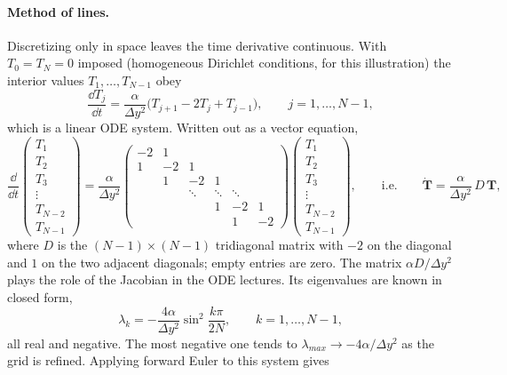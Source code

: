 \paragraph{Method of lines.} Discretizing only in space leaves the time derivative continuous. With $T_0=T_N=0$ imposed (homogeneous Dirichlet conditions, for this illustration) the interior values $T_1,\dots,T_{N-1}$ obey
\begin{equation}
\frac{\dd T_j}{\dd t}=\frac{\alpha}{\Delta y^2}\big(T_{j+1}-2T_j+T_{j-1}\big),\qquad j=1,\dots,N-1,
\end{equation}
which is a linear ODE system. Written out as a vector equation,
\begin{equation}
\frac{\dd}{\dd t}
\begin{pmatrix}T_1\\T_2\\T_3\\\vdots\\T_{N-2}\\T_{N-1}\end{pmatrix}
=\frac{\alpha}{\Delta y^2}
\begin{pmatrix}
-2 & 1 & & & & \\
1 & -2 & 1 & & & \\
 & 1 & -2 & 1 & & \\
 & & \ddots & \ddots & \ddots & \\
 & & & 1 & -2 & 1\\
 & & & & 1 & -2
\end{pmatrix}
\begin{pmatrix}T_1\\T_2\\T_3\\\vdots\\T_{N-2}\\T_{N-1}\end{pmatrix},
\qquad\text{i.e.}\qquad
\dot{\mathbf T}=\frac{\alpha}{\Delta y^2}\,D\,\mathbf T,
\end{equation}
where $D$ is the $(N-1)\times(N-1)$ tridiagonal matrix with $-2$ on the diagonal and $1$ on the two adjacent diagonals; empty entries are zero. The matrix $\alpha D/\Delta y^2$ plays the role of the Jacobian in the ODE lectures. Its eigenvalues are known in closed form,
\begin{equation}
\lambda_k=-\frac{4\alpha}{\Delta y^2}\sin^2\!\frac{k\pi}{2N},\qquad k=1,\dots,N-1,
\end{equation}
all real and negative. The most negative one tends to $\lambda_{max}\to-4\alpha/\Delta y^2$ as the grid is refined. Applying forward Euler to this system gives
